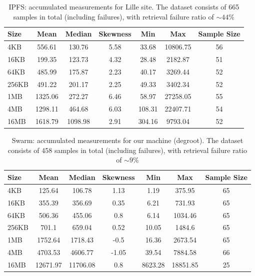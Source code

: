 \begin{table}[H]
\centering
\begin{small}
\caption{IPFS: accumulated measurements for Lille site. The dataset consists of 665 samples in total (including failures), with retrieval failure ratio of $\sim 44\%$ }
\begin{tabular}{@{}lcccccc@{}}
\toprule
Size & Mean & Median & Skewness & Min & Max & Sample Size \\ \midrule
4KB & 556.61 & 130.76 & 5.58 & 33.68 & 10806.75 & 56\\
16KB & 199.35 & 123.73 & 4.32 & 28.48 & 2182.87 & 51\\
64KB & 485.99 & 175.87 & 2.23 & 40.17 & 3269.44 & 52\\
256KB & 491.22 & 201.17 & 2.25 & 49.33 & 3402.34 & 52\\
1MB & 1325.06 & 272.27 & 6.46 & 58.97 & 27258.05 & 55\\
4MB & 1298.11 & 464.68 & 6.03 & 108.31 & 22407.71 & 54\\
16MB & 1618.79 & 1098.98 & 2.91 & 304.16 & 9793.04 & 52\\
\bottomrule
\end{tabular}
\end{small}
\end{table}

\begin{table}[H]
\centering
\begin{small}
\caption{Swarm: accumulated measurements for our machine (degroot). The dataset consists of 458 samples in total (including failures), with retrieval failure ratio of $\sim 9\%$ }
\begin{tabular}{@{}lcccccc@{}}
\toprule
Size & Mean & Median & Skewness & Min & Max & Sample Size \\ \midrule
4KB & 125.64 & 106.78 & 1.13 & 1.19 & 375.95 & 65\\
16KB & 355.39 & 356.69 & 0.35 & 6.21 & 731.93 & 65\\
64KB & 506.36 & 455.06 & 0.8 & 6.14 & 1034.46 & 65\\
256KB & 701.1 & 659.04 & 0.52 & 10.05 & 1484.6 & 65\\
1MB & 1752.64 & 1718.43 & -0.5 & 16.36 & 2673.54 & 65\\
4MB & 4703.53 & 4606.77 & -1.05 & 39.54 & 7884.58 & 66\\
16MB & 12671.97 & 11706.08 & 0.8 & 8623.28 & 18851.85 & 25\\
\bottomrule
\end{tabular}
\end{small}
\end{table}

